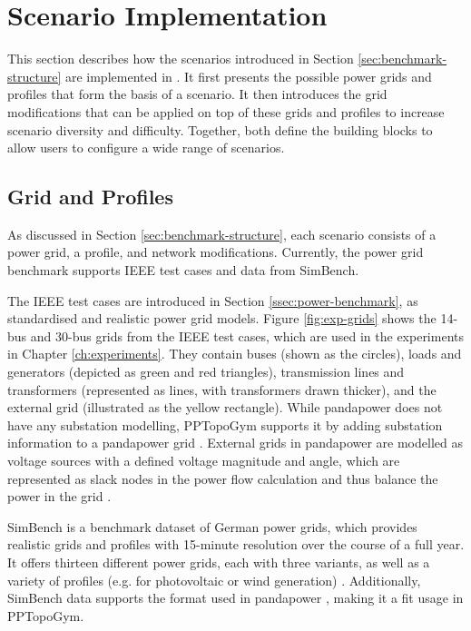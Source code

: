 \section{Scenario Implementation}\label{sec:implementation-scenarios}
This section describes how the scenarios introduced in Section \ref{sec:benchmark-structure} are implemented in \benchmark. It first presents the possible power grids and profiles that form the basis of a scenario. It then introduces the grid modifications that can be applied on top of these grids and profiles to increase scenario diversity and difficulty. Together, both define the building blocks to allow users to configure a wide range of scenarios.

\subsection{Grid and Profiles}\label{ssec:implementation-grid-profiles}
As discussed in Section \ref{sec:benchmark-structure}, each scenario consists of a power grid, a profile, and network modifications. Currently, the power grid benchmark supports IEEE test cases and data from SimBench. 

The IEEE test cases are introduced in Section \ref{ssec:power-benchmark}, as standardised and realistic power grid models. Figure \ref{fig:exp-grids} shows the 14-bus and 30-bus grids from the IEEE test cases, which are used in the experiments in Chapter \ref{ch:experiments}. They contain buses (shown as the circles), loads and generators (depicted as green and red triangles), transmission lines and transformers (represented as lines, with transformers drawn thicker), and the external grid (illustrated as the yellow rectangle). While pandapower does not have any substation modelling, PPTopoGym supports it by adding substation information to a pandapower grid \cite{pptopogym}. External grids in pandapower are modelled as voltage sources with a defined voltage magnitude and angle, which are represented as slack nodes in the power flow calculation and thus balance the power in the grid \cite{pandapower}.

SimBench is a benchmark dataset of German power grids, which provides realistic grids and profiles with 15-minute resolution over the course of a full year. It offers thirteen different power grids, each with three variants, as well as a variety of profiles (e.g. for photovoltaic or wind generation) \cite{simbench}. Additionally, SimBench data supports the format used in pandapower \cite{simbench}, making it a fit usage in PPTopoGym. 

